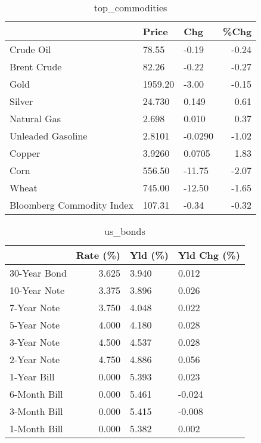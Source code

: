 \documentclass{article}%
\begin{document}
\begin{table}[htbp]%
\caption{top\_commodities}%
\centering%
\begin{adjustbox}{width=1\textwidth}%
\begin{tabular}{lllr}
\toprule
                          &   Price &     Chg &  \%Chg \\
\midrule
               Crude Oil  &   78.55 &   -0.19 & -0.24 \\
             Brent Crude  &   82.26 &   -0.22 & -0.27 \\
                    Gold  & 1959.20 &   -3.00 & -0.15 \\
                  Silver  &  24.730 &   0.149 &  0.61 \\
             Natural Gas  &   2.698 &   0.010 &  0.37 \\
       Unleaded Gasoline  &  2.8101 & -0.0290 & -1.02 \\
                  Copper  &  3.9260 &  0.0705 &  1.83 \\
                    Corn  &  556.50 &  -11.75 & -2.07 \\
                   Wheat  &  745.00 &  -12.50 & -1.65 \\
Bloomberg Commodity Index &  107.31 &   -0.34 & -0.32 \\
\bottomrule
\end{tabular}
%
\end{adjustbox}%
\end{table}

%


\begin{table}[htbp]%
\caption{us\_bonds}%
\centering%
\begin{adjustbox}{width=1\textwidth}%
\begin{tabular}{lrll}
\toprule
             &  Rate (\%) & Yld (\%) & Yld Chg (\%) \\
\midrule
30-Year Bond &     3.625 &   3.940 &       0.012 \\
10-Year Note &     3.375 &   3.896 &       0.026 \\
 7-Year Note &     3.750 &   4.048 &       0.022 \\
 5-Year Note &     4.000 &   4.180 &       0.028 \\
 3-Year Note &     4.500 &   4.537 &       0.028 \\
 2-Year Note &     4.750 &   4.886 &       0.056 \\
 1-Year Bill &     0.000 &   5.393 &       0.023 \\
6-Month Bill &     0.000 &   5.461 &      -0.024 \\
3-Month Bill &     0.000 &   5.415 &      -0.008 \\
1-Month Bill &     0.000 &   5.382 &       0.002 \\
\bottomrule
\end{tabular}
%
\end{adjustbox}%
\end{table}
\end{document}
